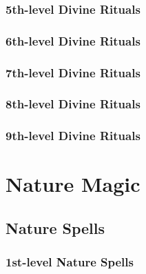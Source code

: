 \subsubsection{5th-level Divine Rituals}
\begin{rituallist}
    \SLatonement
    \SLbreakenchantment
    \SLcommune
    \SLdimensionallock
    \SLdream
    \SLresurrection
    \SLscrying
\end{rituallist}

\subsubsection{6th-level Divine Rituals}
\begin{rituallist}
    \SLfindthepath
    \SLgeasquest
    \SLplaneshift
\end{rituallist}

\subsubsection{7th-level Divine Rituals}
\begin{rituallist}
    \SLcontrolweather
    \SLinstantrefuge
\end{rituallist}

\subsubsection{8th-level Divine Rituals}
\begin{rituallist}
    \SLdiscernlocation
\end{rituallist}

\subsubsection{9th-level Divine Rituals}
\begin{rituallist}
    \SLsoulbind
\end{rituallist}

\section{Nature Magic}\label{Nature Magic}
\subsection{Nature Spells}\label{Nature Spells}

\subsubsection{1st-level Nature Spells}
\begin{spelllist}
    \SLburninghands
    \SLcurewounds
    \SLearthenblade
    \SLentangle
    \SLexcreteslime
    \SLfaeriefire
    \SLgentledescent
    \SLgustofwind
    \SLlongstrider
    \SLregeneration
    \SLresistenergy
    \SLresistpoison
    \SLrottinggrasp
    \SLsummonnaturesally
    \SLtremorsense
    \SLwaterwalk
\end{spelllist}

